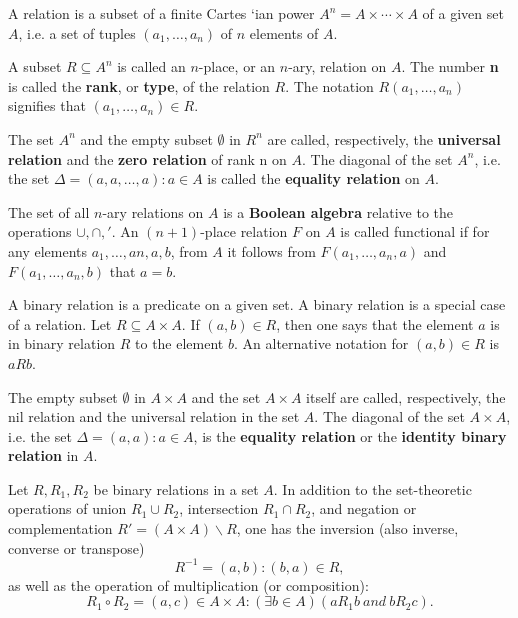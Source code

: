 \begin{definition}[Relation]
	\cite{1}
	A relation is a subset of a finite Cartes	`ian power $A^n=A\times\cdots\times A$ of a given set $A$,
	i.e. a set of tuples $(a_1,\dots,a_n)$ of $n$ elements of $A$.

	A subset $R\subseteq A^n$ is called an $n$-place, or an $n$-ary, relation on $A$.
	The number \textbf{n} is called the \textbf{rank}, or \textbf{type}, of the relation $R$.
	The notation $R(a_1,\dots,a_n)$ signifies that $(a_1,\dots,a_n)\in R$.

	The set $A^n$ and the empty subset $\emptyset$ in $R^n$ are called, respectively, the \textbf{universal relation} and the \textbf{zero relation} of rank n on $A$.
	The diagonal of the set $A^n$, i.e. the set $\Delta={(a,a,\dots,a):a\in A}$ is called the \textbf{equality relation} on $A$.

\end{definition}

The set of all $n$-ary relations on $A$ is a \textbf{Boolean algebra} relative to the operations $\cup, \cap, '$.
An $(n+1)$-place relation $F$ on $A$ is called functional if for any elements $a_1,\dots,an, a,b$, from $A$
it follows from $F(a_1,\dots,a_n,a)$ and $F(a_1,\dots,a_n,b)$ that $a=b$.

\begin{definition}
	\cite{2}
	A binary relation is a predicate on a given set.
	A binary relation is a special case of a relation. Let $R \subseteq A \times A$.
	If $(a,b) \in R$, then one says that the element $a$ is in binary relation $R$ to the element $b$.
	An alternative notation for $(a,b) \in R$ is $aRb$.

	The empty subset $\emptyset$ in $A\times A$ and the set $A\times A$ itself are called, respectively,
	the nil relation and the universal relation in the set $A$.
	The diagonal of the set $A\times A$, i.e. the set $\Delta={(a,a):a\in A}$,
	is the \textbf{equality relation} or the \textbf{identity binary relation} in $A$.

\end{definition}

Let $R,R_1,R_2$ be binary relations in a set $A$. In addition to the set-theoretic operations of union $R_1\cup R_2$,
intersection $R_1\cap R_2$, and negation or complementation $R'=(A\times A)\backslash R$,
one has the inversion (also inverse, converse or transpose)
\[R^{-1}={(a,b):(b,a)\in R},\]
as well as the operation of multiplication (or composition):
\[R_1\circ R_2={(a,c)\in A\times A:(\exists b\in A)(aR_1b\ and\ bR_2c)}.\]

